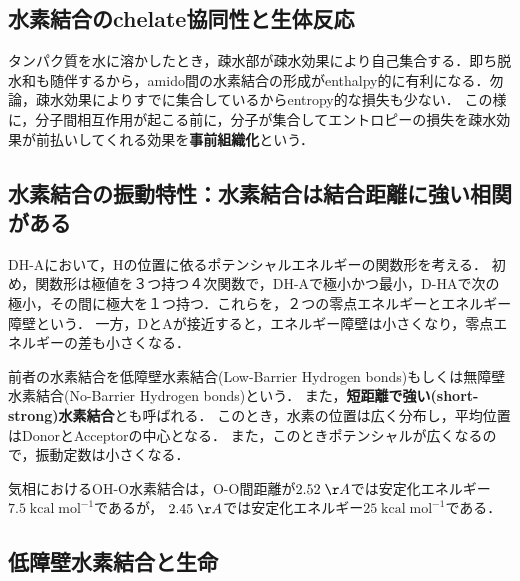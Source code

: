\documentclass[uplatex, dvipdfmx]{jsreport}
\begin{document}
\subsection{水素結合のchelate協同性と生体反応}

\begin{definition}[preorganization]\label{def-preorganization}
    タンパク質を水に溶かしたとき，疎水部が疎水効果により自己集合する．即ち脱水和も随伴するから，amido間の水素結合の形成がenthalpy的に有利になる．勿論，疎水効果によりすでに集合しているからentropy的な損失も少ない．
    この様に，分子間相互作用が起こる前に，分子が集合してエントロピーの損失を疎水効果が前払いしてくれる効果を\textbf{事前組織化}という．
\end{definition}

\subsection{水素結合の振動特性：水素結合は結合距離に強い相関がある}

DH-Aにおいて，Hの位置に依るポテンシャルエネルギーの関数形を考える．
初め，関数形は極値を３つ持つ４次関数で，DH-Aで極小かつ最小，D-HAで次の極小，その間に極大を１つ持つ．これらを，２つの零点エネルギーとエネルギー障壁という．
一方，DとAが接近すると，エネルギー障壁は小さくなり，零点エネルギーの差も小さくなる．
\begin{definition}
    前者の水素結合を低障壁水素結合(Low-Barrier Hydrogen bonds)もしくは無障壁水素結合(No-Barrier Hydrogen bonds)という．
    また，\textbf{短距離で強い(short-strong)水素結合}とも呼ばれる．
    このとき，水素の位置は広く分布し，平均位置はDonorとAcceptorの中心となる．
    また，このときポテンシャルが広くなるので，振動定数は小さくなる．
\end{definition}
\begin{example}
    気相におけるOH-O水素結合は，O-O間距離が$2.52\;\AA$では安定化エネルギー$7.5\;\mathrm{kcal\;mol^{-1}}$であるが，
    $2.45\;\AA$では安定化エネルギー$25\;\mathrm{kcal\;mol^{-1}}$である．
\end{example}

\subsection{低障壁水素結合と生命}
\end{document}
